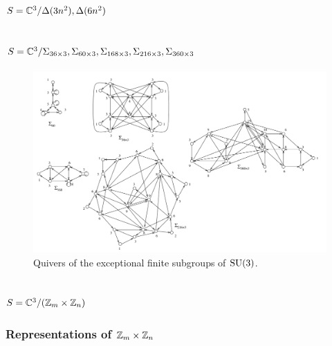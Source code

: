     \subsection{$S=\mathbb{C}^3/\Delta(3n^2),\Delta(6n^2)$}

    \subsection{$S=\mathbb{C}^3/\Sigma_{36\times 3},\Sigma_{60\times 3},\Sigma_{168\times 3},\Sigma_{216\times 3},\Sigma_{360\times 3}$}

        \begin{figure}[H]
            \centering
            \includegraphics[scale=0.4]{Pictures/SU3finitequivers.png}
            \caption{Quivers of the exceptional finite subgroups of $\text{SU}(3)$.}
        \end{figure}

    \subsection{$S=\mathbb{C}^3/(\mathbb{Z}_m\times\mathbb{Z}_n)$}

        \subsubsection{Representations of $\mathbb{Z}_m\times\mathbb{Z}_n$}

